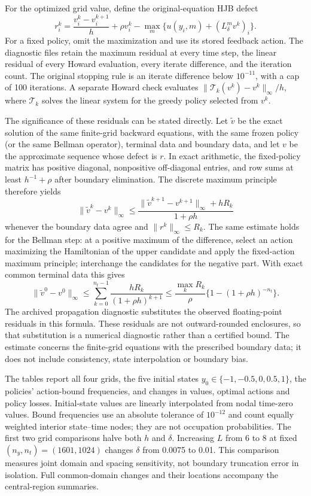 For the optimized grid value, define the original-equation HJB defect
\[
 r_i^k=\frac{v_i^k-v_i^{k+1}}{h}+\rho v_i^k
       -\max_m\{u(y_i,m)+(L^m_\delta v^k)_i\}.
\]
For a fixed policy, omit the maximization and use its stored feedback action.
The diagnostic files retain the maximum residual at every time step, the
linear residual of every Howard evaluation, every iterate difference, and
the iteration count. The original stopping rule is an iterate difference
below $10^{-11}$, with a cap of 100 iterations. A separate Howard check
evaluates $\|\mathcal T_k(v^k)-v^k\|_\infty/h$, where $\mathcal T_k$
solves the linear system for the greedy policy selected from $v^k$.

The significance of these residuals can be stated directly. Let
$\widetilde v$ be the exact solution of the same finite-grid backward
equations, with the same frozen policy (or the same Bellman operator),
terminal data and boundary data, and let $v$ be the approximate sequence
whose defect is $r$. In exact arithmetic, the fixed-policy matrix has
positive diagonal, nonpositive
off-diagonal entries, and row sums at least $h^{-1}+\rho$ after boundary
elimination. The discrete maximum principle therefore yields
\[
 \|\widetilde v^k-v^k\|_\infty
 \le \frac{\|\widetilde v^{k+1}-v^{k+1}\|_\infty+hR_k}{1+\rho h}
\]
whenever the boundary data agree and $\|r^k\|_\infty\le R_k$.
The same estimate holds for the Bellman step: at a positive maximum of the
difference, select an action maximizing the Hamiltonian of the upper
candidate and apply the fixed-action maximum principle; interchange the
candidates for the negative part. With exact common terminal data this gives
\[
 \|\widetilde v^0-v^0\|_\infty
 \le\sum_{k=0}^{n_t-1}\frac{hR_k}{(1+\rho h)^{k+1}}
 \le \frac{\max_k R_k}{\rho}\{1-(1+\rho h)^{-n_t}\}.
\]
The archived propagation diagnostic substitutes the observed floating-point
residuals in this formula. These residuals are not outward-rounded enclosures,
so that substitution is a numerical diagnostic rather than a certified bound.
The estimate concerns the finite-grid equations with the prescribed boundary
data; it does not include consistency, state interpolation or boundary bias.

The tables report all four grids, the five initial states
$y_0\in\{-1,-0.5,0,0.5,1\}$, the policies' action-bound frequencies, and
changes in values, optimal actions and policy losses. Initial-state values
are linearly interpolated from nodal time-zero values. Bound frequencies
use an absolute tolerance of $10^{-12}$ and count equally weighted interior
state--time nodes; they are not occupation probabilities. The first two grid
comparisons halve both $h$ and $\delta$. Increasing $L$ from 6 to 8 at fixed
$(n_y,n_t)=(1601,1024)$ changes $\delta$ from 0.0075 to 0.01. This comparison
measures joint domain and spacing sensitivity, not boundary truncation error
in isolation. Full common-domain changes and their locations accompany the
central-region summaries.

